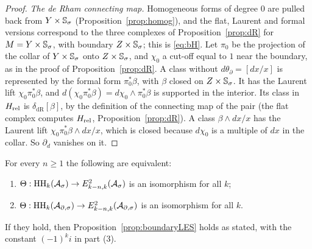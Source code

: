 \begin{proof}
\emph{The de Rham connecting map.} Homogeneous forms of degree \(0\) are
pulled back from \(Y\times\mathbb S_\sigma\) (Proposition~\ref{prop:homog}), and the
flat, Laurent and formal versions correspond to the three complexes of
Proposition~\ref{prop:dR} for \(M=Y\times\mathbb S_\sigma\), with boundary
\(Z\times\mathbb S_\sigma\); this is \eqref{eq:bH}. Let \(\pi_0\) be the projection
of the collar of \(Y\times\mathbb S_\sigma\) onto \(Z\times\mathbb S_\sigma\), and \(\chi_0\) a
cut-off equal to \(1\) near the boundary, as in the proof of
Proposition~\ref{prop:dR}. A class without \(d\theta_\partial=[dx/x]\) is
represented by the formal form \(\pi_0^*\beta\), with \(\beta\) closed on
\(Z\times\mathbb S_\sigma\). It has the Laurent lift \(\chi_0\pi_0^*\beta\), and
\(d(\chi_0\pi_0^*\beta)=d\chi_0\wedge\pi_0^*\beta\) is supported in the
interior. Its class in \(H_{\mathrm{rel}}\) is \(\delta_{\mathrm{dR}}[\beta]\), by
the definition of the connecting map of the pair (the flat complex
computes \(H_{\mathrm{rel}}\), Proposition~\ref{prop:dR}). A class
\(\beta\wedge dx/x\) has the Laurent lift \(\chi_0\pi_0^*\beta\wedge
dx/x\), which is closed because \(d\chi_0\) is a multiple of \(dx\) in
the collar. So \(\partial_d\) vanishes on it.
\end{proof}

\begin{proposition}
\label{ha:prop:equiv}
For every \(n\ge1\) the following are equivalent:
\begin{enumerate}
\item \(\Theta:\operatorname{HH}_k(\mathcal A_\sigma)\to E^2_{k-n,k}(\mathcal A_\sigma)\) is an isomorphism for all
\(k\);
\item \(\Theta:\operatorname{HH}_k(\mathcal A_{\partial,\sigma})\to E^2_{k-n,k}(\mathcal A_{\partial,\sigma})\) is an isomorphism for
all \(k\).
\end{enumerate}
If they hold, then Proposition~\ref{prop:boundaryLES} holds as stated,
with the constant \((-1)^ki\) in part (3).
\end{proposition}

